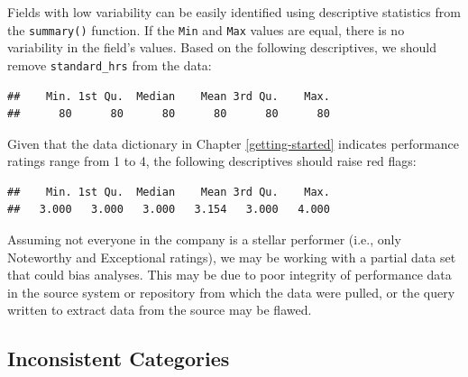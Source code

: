 \documentclass[
]{book}
\newenvironment{Shaded}{\begin{snugshade}}{\end{snugshade}}
\newcommand{\CommentTok}[1]{\textcolor[rgb]{0.56,0.35,0.01}{\textit{#1}}}
\newcommand{\FunctionTok}[1]{\textcolor[rgb]{0.00,0.00,0.00}{#1}}
\newcommand{\NormalTok}[1]{#1}
\newcommand{\SpecialCharTok}[1]{\textcolor[rgb]{0.00,0.00,0.00}{#1}}
\begin{document}
Fields with low variability can be easily identified using descriptive statistics from the \texttt{summary()} function. If the \texttt{Min} and \texttt{Max} values are equal, there is no variability in the field's values. Based on the following descriptives, we should remove \texttt{standard\_hrs} from the data:

\begin{Shaded}
\end{Shaded}

\begin{verbatim}
##    Min. 1st Qu.  Median    Mean 3rd Qu.    Max. 
##      80      80      80      80      80      80
\end{verbatim}

Given that the data dictionary in Chapter \ref{getting-started} indicates performance ratings range from 1 to 4, the following descriptives should raise red flags:

\begin{Shaded}
\end{Shaded}

\begin{verbatim}
##    Min. 1st Qu.  Median    Mean 3rd Qu.    Max. 
##   3.000   3.000   3.000   3.154   3.000   4.000
\end{verbatim}

Assuming not everyone in the company is a stellar performer (i.e., only Noteworthy and Exceptional ratings), we may be working with a partial data set that could bias analyses. This may be due to poor integrity of performance data in the source system or repository from which the data were pulled, or the query written to extract data from the source may be flawed.

\hypertarget{inconsistent-categories}{%
\subsection{Inconsistent Categories}\label{inconsistent-categories}}
\end{document}
